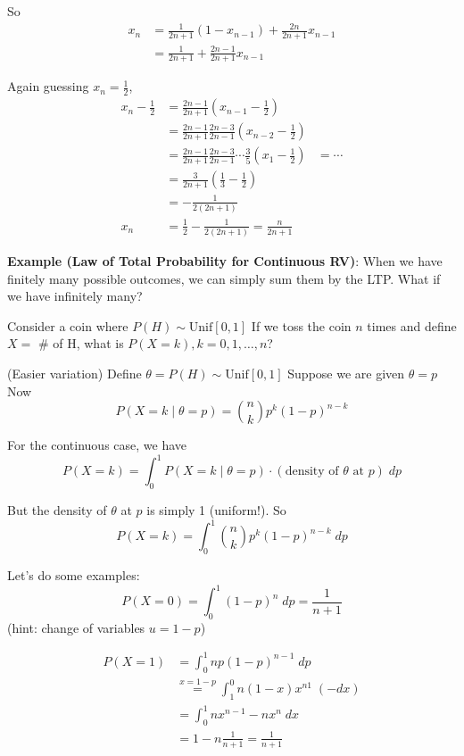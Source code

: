 \documentclass[12pt]{report}
\begin{document}
    So 
    \begin{align*}
        x_n &= \frac{1}{2n+1}(1 - x_{n-1}) + \frac{2n}{2n+1}x_{n-1}\\
        &= \frac{1}{2n+1} + \frac{2n - 1}{2n+1}x_{n-1}
    \end{align*}

    Again guessing $x_n = \frac{1}{2}$, 
    \begin{align*}
        x_n - \frac{1}{2} &= \frac{2n - 1}{2n + 1}(x_{n-1} - \frac{1}{2})\\ 
        &= \frac{2n - 1}{2n + 1}\frac{2n - 3}{2n - 1}(x_{n-2} - \frac{1}{2})\\
        &= \frac{2n - 1}{2n + 1}\frac{2n - 3}{2n - 1}\cdots \frac{3}{5}(x_{1} - \frac{1}{2})
        &= \cdots\\
        &= \frac{3}{2n+1}(\frac{1}{3}- \frac{1}{2})\\ 
        &= -\frac{1}{2(2n+1)}\\
        x_n &= \frac{1}{2} - \frac{1}{2(2n+1)} = \boxed{\frac{n}{2n + 1}}
    \end{align*}

    \textbf{Example (Law of Total Probability for Continuous RV)}: When we have finitely many possible outcomes, we can simply sum them by the LTP. What if we have infinitely many? 
    
    Consider a coin where $P(H) \sim \text{Unif}[0, 1]$ If we toss the coin $n$ times and define $X = $ \# of H, what is $P(X = k), k = 0, 1, \dots, n$?

    (Easier variation) Define $\theta = P(H) \sim \text{Unif}[0, 1]$ Suppose we are given $\theta = p$ Now 
    \[P(X = k \; | \; \theta = p) = \binom{n}{k} p^k (1 -p)^{n-k}\]

    For the continuous case, we have 
    \[P(X = k) = \int_0^1 P(X = k \; | \; \theta = p) \cdot (\text{density of } \theta \text{ at } p)\; dp\]

    But the density of $\theta$ at $p$ is simply 1 (uniform!). So
    \[P(X = k) = \int_0^1 \binom{n}{k} p^k (1 - p)^{n-k} \; dp\]
    
    Let's do some examples:
    \[P(X = 0) = \int_0^1 (1 - p)^n \; dp = \frac{1}{n + 1}\]
    (hint: change of variables $u = 1 - p$)

    \begin{align*}
        P(X = 1) &= \int_0^1 n p(1-p)^{n-1} \; dp\\ 
        &\overset{x = 1 - p}{=} \int_1^0 n(1 - x)x^{n1}\; (-dx)\\ 
        &= \int_0^1 nx^{n-1} - nx^n\; dx\\ 
        &= 1  - n \frac{1}{n + 1} = \frac{1}{n + 1}
    \end{align*}
\end{document}
